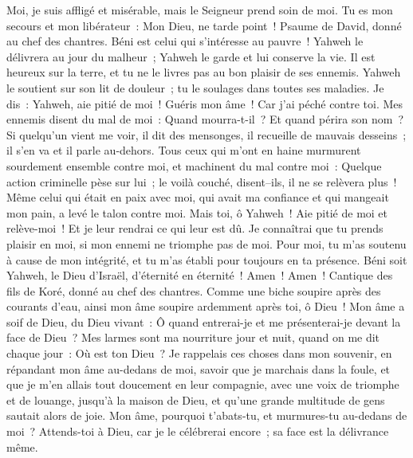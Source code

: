 \begin{multicols}{2}
Moi, je suis affligé et misérable, mais le Seigneur prend soin de moi. Tu es mon secours et mon libérateur~: Mon Dieu, ne tarde point~!
\VerseOne{}Psaume de David, donné au chef des chantres.
Béni est celui qui s'intéresse au pauvre~! Yahweh le délivrera au jour du malheur~;
Yahweh le garde et lui conserve la vie. Il est heureux sur la terre, et tu ne le livres pas au bon plaisir de ses ennemis.
Yahweh le soutient sur son lit de douleur~; tu le soulages dans toutes ses maladies.
Je dis~: Yahweh, aie pitié de moi~! Guéris mon âme~! Car j'ai péché contre toi.
Mes ennemis disent du mal de moi~: Quand mourra-t-il~? Et quand périra son nom~?
Si quelqu'un vient me voir, il dit des mensonges, il recueille de mauvais desseins~; il s'en va et il parle au-dehors.
Tous ceux qui m'ont en haine murmurent sourdement ensemble contre moi, et machinent du mal contre moi~:
Quelque action criminelle pèse sur lui~; le voilà couché, disent–ils, il ne se relèvera plus~!
Même celui qui était en paix avec moi, qui avait ma confiance et qui mangeait mon pain, a levé le talon contre moi.
Mais toi, ô Yahweh~! Aie pitié de moi et relève-moi~! Et je leur rendrai ce qui leur est dû.
Je connaîtrai que tu prends plaisir en moi, si mon ennemi ne triomphe pas de moi.
Pour moi, tu m'as soutenu à cause de mon intégrité, et tu m'as établi pour toujours en ta présence.
Béni soit Yahweh, le Dieu d'Israël, d'éternité en éternité~! Amen~! Amen~!
\VerseOne{}Cantique des fils de Koré, donné au chef des chantres.
Comme une biche soupire après des courants d'eau, ainsi mon âme soupire ardemment après toi, ô Dieu~!
Mon âme a soif de Dieu, du Dieu vivant~: Ô quand entrerai-je et me présenterai-je devant la face de Dieu~?
Mes larmes sont ma nourriture jour et nuit, quand on me dit chaque jour~: Où est ton Dieu~?
Je rappelais ces choses dans mon souvenir, en répandant mon âme au-dedans de moi, savoir que je marchais dans la foule, et que je m'en allais tout doucement en leur compagnie, avec une voix de triomphe et de louange, jusqu'à la maison de Dieu, et qu'une grande multitude de gens sautait alors de joie.
Mon âme, pourquoi t'abats-tu, et murmures-tu au-dedans de moi~? Attends-toi à Dieu, car je le célébrerai encore~; sa face est la délivrance même.

\end{multicols}
